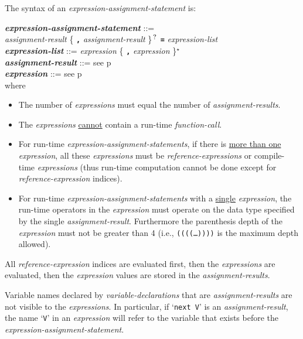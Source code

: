 \documentclass[12pt]{article}
\newcommand{\TT}[1]{{\tt \bfseries #1}}
\newcommand{\STAR}{{\Large $^\star$}}
\newcommand{\QMARK}{{$^{\,\mbox{\footnotesize ?}}$}}
\newcommand{\emkey}[1]{{\em \bfseries #1}}
\newcommand{\pagref}[1]{p\pageref{#1}}
\newenvironment{indpar}[1][0.3in]%
	{\begin{list}{}%
		     {\setlength{\itemsep}{0in}%
		      \setlength{\topsep}{0in}%
		      \setlength{\parsep}{1ex}%
		      \setlength{\labelwidth}{#1}%
		      \setlength{\leftmargin}{#1}%
		      \addtolength{\leftmargin}{\labelsep}}%
	 \item}%
	{\end{list}}
\begin{document}
The syntax of an {\em expression-assign\-ment-statement} is:
\begin{indpar}
\emkey{expression-assignment-statement} ::= \\
\hspace*{0.5in} {\em assignment-result}
                \{ \TT{,} {\em assignment-result} \}\QMARK{}
		\TT{=} {\em expression-list}
\\[0.5ex]
\emkey{expression-list}\label{EXPRESSION-LIST} ::=
	      {\em expression} \{ \TT{,} {\em expression} \}\STAR{}
\\[0.5ex]
\emkey{assignment-result} ::= see \pagref{ASSIGNMENT-RESULT}
\\[0.5ex]
\emkey{expression} ::= see \pagref{EXPRESSION}
\\[2.0ex]
where
\begin{itemize}

\item The number of {\em expressions} must equal the number
of {\em assignment-results}.

\item The
{\em expressions} \underline{cannot} contain a run-time {\em function-call}.

\item For run-time {\em expression-assignment-statements}, if
there is \underline{more than one} {\em expression}, all these
{\em expressions} must be {\em reference-expressions} or
compile-time {\em expressions} (thus run-time computation cannot
be done except for {\em reference-expression} indices).

\item For run-time {\em expression-assignment-statements} with
a \underline{single} {\em expression}, the run-time operators
in the {\em expression} must operate on
the data type specified by the single {\em assignment-result}.
Furthermore the parenthesis depth of the {\em expression}
must not be greater than 4 (i.e., {\tt ((((\ldots))))} is the
maximum depth allowed).

\end{itemize}
\end{indpar}

All {\em reference-expression} indices are evaluated first,
then the {\em expressions} are evaluated,
then the {\em expression} values are stored in the {\em assignment-results}.

Variable names declared by {\em variable-declarations} that are
{\em assignment-results} are not visible to the {\em expressions}.
In particular, if `{\tt next V}' is an {\em assignment-result},
the name `{\tt V}' in an {\em expression} will refer to the variable
that exists before the {\em expression-assignment-statement}.
\end{document}

